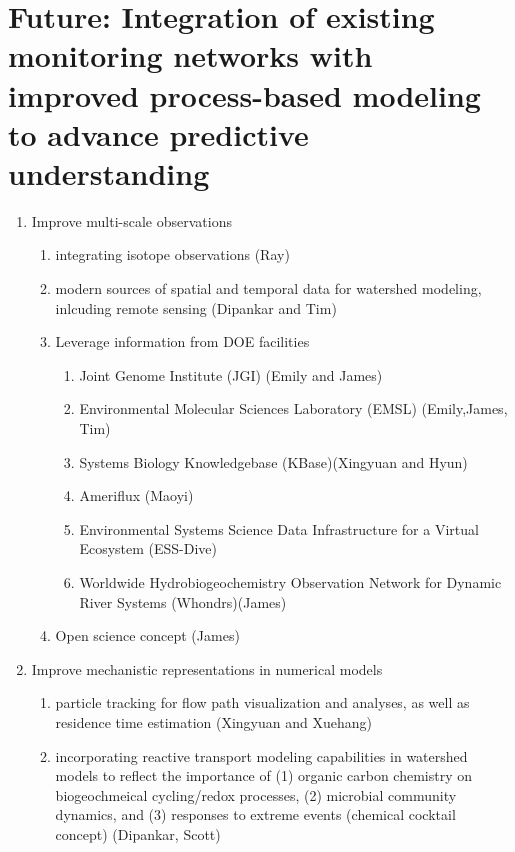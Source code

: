 \documentclass[preprint,review, 12pt]{elsarticle}
\begin{document}
\section{Future: Integration of existing monitoring networks with improved process-based modeling to advance predictive understanding}
\begin{enumerate} 
    \item Improve multi-scale observations
        \begin{enumerate}
            \item integrating isotope observations (Ray)
            \item modern sources of spatial and temporal data for watershed modeling, inlcuding remote sensing (Dipankar and Tim)
            \item Leverage information from DOE facilities
                \begin{enumerate}
                    \item Joint Genome Institute (JGI) (Emily and James)
                    \item Environmental Molecular Sciences Laboratory (EMSL) (Emily,James, Tim)
                    \item Systems Biology Knowledgebase (KBase)(Xingyuan and Hyun)
                    \item Ameriflux (Maoyi)
                    \item Environmental Systems Science Data Infrastructure for a Virtual Ecosystem (ESS-Dive)
                    \item Worldwide Hydrobiogeochemistry Observation Network for Dynamic River Systems (Whondrs)(James)
                \end{enumerate}
            \item Open science concept (James)
        \end{enumerate}
    \item Improve mechanistic representations in numerical models
        \begin{enumerate}   
            \item particle tracking for flow path visualization and analyses, as well as residence time estimation (Xingyuan and Xuehang)
            \item incorporating reactive transport modeling capabilities in watershed models to reflect the importance of (1) organic carbon chemistry on biogeochmeical cycling/redox processes, (2) microbial community dynamics, and (3) responses to extreme events (chemical cocktail concept) (Dipankar, Scott)

\end{enumerate}
\end{enumerate}
\end{document}
